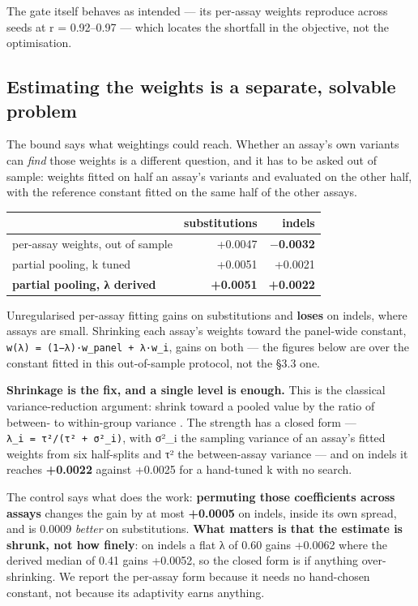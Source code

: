 \documentclass{article}
\begin{document}
The gate itself behaves as intended --- its per-assay weights reproduce across seeds at r = 0.92--0.97 --- which
locates the shortfall in the objective, not the optimisation.

\subsection{Estimating the weights is a separate, solvable problem}\label{estimating-the-weights-is-a-separate-solvable-problem}

The bound says what weightings could reach. Whether an assay's own variants can \emph{find} those weights is a
different question, and it has to be asked out of sample: weights fitted on half an assay's variants and
evaluated on the other half, with the reference constant fitted on the same half of the other assays.

\begin{table}[!t]
\centering
\small
\begin{tabular}{lrr}
\hline
 & substitutions & indels \\
\hline
per-assay weights, out of sample & +0.0047 & \textbf{$-$0.0032} \\
partial pooling, k tuned & +0.0051 & +0.0021 \\
\textbf{partial pooling, λ derived} & \textbf{+0.0051} & \textbf{+0.0022} \\
\hline
\end{tabular}
\end{table}

Unregularised per-assay fitting gains on substitutions and \textbf{loses} on indels, where assays are small. Shrinking
each assay's weights toward the panel-wide constant, \texttt{w(λ)\ =\ (1−λ)·w\_panel\ +\ λ·w\_i}, gains on both --- the figures
below are over the constant fitted in this out-of-sample protocol, not the §3.3 one.

\textbf{Shrinkage is the fix, and a single level is enough.} This is the classical variance-reduction argument: shrink toward a pooled
value by the ratio of between- to within-group variance \cite{james1961stein}. The strength has a closed form --- \texttt{λ\_i\ =\ τ²/(τ²\ +\ σ²\_i)},
with σ²\_i the sampling variance of an assay's fitted weights from six half-splits and τ² the between-assay
variance --- and on indels it reaches \textbf{+0.0022} against +0.0025 for a hand-tuned k with no search.

The control says what does the work: \textbf{permuting those coefficients across assays} changes the gain by at most
\textbf{+0.0005} on indels, inside its own spread, and is 0.0009 \emph{better} on substitutions. \textbf{What matters is that the estimate is shrunk, not how finely}: on indels a flat λ of 0.60 gains +0.0062 where the
derived median of 0.41 gains +0.0052, so the closed form is if anything over-shrinking. We report the per-assay form
because it needs no hand-chosen constant, not because its adaptivity earns anything.
\end{document}
